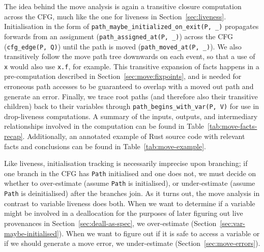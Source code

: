 \documentclass[11pt,a4paper,twoside,openany]{report}
\newcommand{\InRust}[1]{\texttt{#1}}
\newcommand{\InDatalog}[1]{\texttt{#1}}
\begin{document}
The idea behind the move analysis is again a transitive closure computation
across the CFG, much like the one for liveness in Section~\ref{sec:liveness}.
Initialisation in the form of \InDatalog{path_maybe_initialized_on_exit(P, _)}
propagates forwards from an assignment (\InDatalog{path_assigned_at(P, _)})
across the CFG (\InDatalog{cfg_edge(P, Q)}) until the path is moved
(\InDatalog{path_moved_at(P, _)}). We also transitively follow the move path
tree downwards on each event, so that a use of \InRust{x} would also use
\InRust{x.f}, for example. This transitive expansion of facts happens in a
pre-computation described in Section~\ref{sec:move:fixpoints}, and is needed for
erroneous path accesses to be guaranteed to overlap with a moved out path and
generate an error. Finally, we trace root paths (and therefore also their
transitive children) back to their variables through
\InDatalog{path_begins_with_var(P, V)} for use in drop-liveness computations. A
summary of the inputs, outputs, and intermediary relationships involved in the
computation can be found in Table~\ref{tab:move-facts-recap}. Additionally, an
annotated example of Rust source code with relevant facts and conclusions can be
found in Table~\ref{tab:move-example}.

Like liveness, initialisation tracking is necessarily imprecise upon branching;
if one branch in the CFG has \InDatalog{Path} initialised and one does not, we
must decide on whether to over-estimate (assume \InDatalog{Path} is
initialised), or under-estimate (assume \InDatalog{Path} is deinitialised) after
the branches join. As it turns out, the move analysis in contrast to variable
liveness does both. When we want to determine if a variable might be involved in
a deallocation for the purposes of later figuring out live provenances in
Section~\ref{sec:deall-as-spec}, we over-estimate
(Section~\ref{sec:var-maybe-initialised}). When we want to figure out if it is
safe to access a variable or if we should generate a move error, we
under-estimate (Section~\ref{sec:move-errors}).
\end{document}
